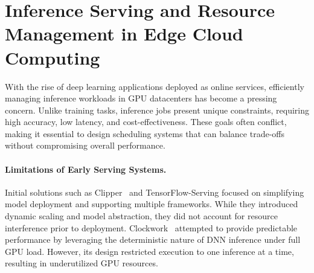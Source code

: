 \section{Inference Serving and Resource Management in Edge Cloud Computing}\label{sec:inference_serving_and_resource_management_in_edge_cloud_computing}

With the rise of deep learning applications deployed as online services, efficiently managing inference workloads in GPU datacenters has become a pressing concern. Unlike training tasks, inference jobs present unique constraints, requiring high accuracy, low latency, and cost-effectiveness. These goals often conflict, making it essential to design scheduling systems that can balance trade-offs without compromising overall performance.

\paragraph{Limitations of Early Serving Systems.}
Initial solutions such as Clipper~\cite{2017clipper} and TensorFlow-Serving focused on simplifying model deployment and supporting multiple frameworks. While they introduced dynamic scaling and model abstraction, they did not account for resource interference prior to deployment. Clockwork~\cite{gujarati2020servingdnnslikeclockwork} attempted to provide predictable performance by leveraging the deterministic nature of DNN inference under full GPU load. However, its design restricted execution to one inference at a time, resulting in underutilized GPU resources.


